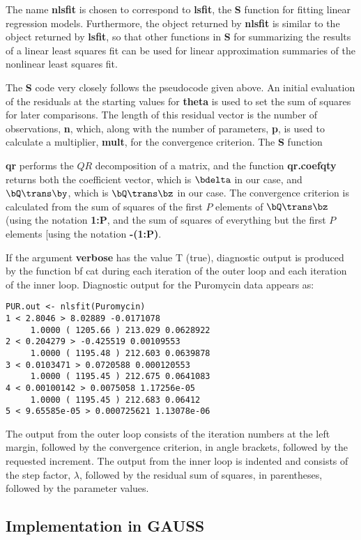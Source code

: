 The name {\bf nlsfit} is chosen to correspond to
{\bf lsfit}, the {\bf S} function for fitting
linear regression models.  Furthermore, the object returned by
{\bf nlsfit} is similar to the object returned by {\bf lsfit}, so that
other functions in {\bf S} for
summarizing the results of a linear least squares fit can be used for
linear approximation summaries of the nonlinear least squares fit.

The {\bf S} code very closely follows the pseudocode given
above.  An initial evaluation of the residuals at the starting values
for {\bf theta} is used to set the sum of squares for later
comparisons.  The length of this residual vector is the number of
observations, {\bf n}, which, along with the number of
parameters, {\bf p}, is used to calculate a multiplier,
{\bf mult}, for the convergence criterion.  The
{\bf S} function {{\bf qr} performs the $QR$
decomposition of a matrix, and the function {\bf qr.coefqty}
returns both the coefficient vector, which is $\bdelta$ in our case,
and $\bQ \trans \by$, which is $\bQ \trans \bz$ in our case.  The
convergence criterion is calculated from the sum of squares of the
first $P$ elements of $\bQ \trans \bz$ (using the notation {\bf 1:P},
and the sum of squares of everything but the first $P$ elements [using the
notation {\bf -(1:P)}.

If the argument {\bf verbose} has the value T (true),
diagnostic output is produced by the function {bf cat}
during each iteration of the outer loop and each iteration of the
inner loop.  Diagnostic output for the Puromycin data appears as:
\begin{verbatim}
PUR.out <- nlsfit(Puromycin)
1 < 2.8046 > 8.02889 -0.0171078
     1.0000 ( 1205.66 ) 213.029 0.0628922
2 < 0.204279 > -0.425519 0.00109553
     1.0000 ( 1195.48 ) 212.603 0.0639878
3 < 0.0103471 > 0.0720588 0.000120553
     1.0000 ( 1195.45 ) 212.675 0.0641083
4 < 0.00100142 > 0.0075058 1.17256e-05
     1.0000 ( 1195.45 ) 212.683 0.06412
5 < 9.65585e-05 > 0.000725621 1.13078e-06
\end{verbatim}

The output from the outer loop consists of the iteration numbers at
the left margin, followed by the convergence criterion, in angle
brackets, followed by the requested increment.  The output from the
inner loop is indented and consists of the step factor, $\lambda$,
followed by the residual sum of squares, in parentheses, followed by
the parameter values.

\subsection{Implementation in GAUSS}

}
